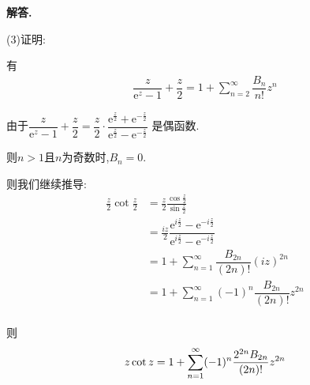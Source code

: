 \documentclass[12pt, a4paper, oneside]{ctexart}
\newenvironment{solution}{\par\noindent\textbf{解答. }}{\par}
\begin{document}
\begin{solution}
\par
(3)证明:
\par
有
$$
\begin{aligned}
\dfrac{z}{\mathrm{e}^z-1}+\dfrac{z}{2}=1+\sum_{n=2}^{\infty}\dfrac{B_n}{n!}z^n
\end{aligned}
$$
\par
由于$\dfrac{z}{\mathrm{e}^z-1}+\dfrac{z}{2}=
\dfrac{z}{2}\cdot\dfrac{\mathrm{e}^{\frac{z}{2}}
+\mathrm{e}^{-\frac{z}{2}}}{\mathrm{e}^{\frac{z}{2}}-\mathrm{e}^{-\frac{z}{2}}}$
是偶函数.
\par
则$n>1$且$n$为奇数时,$B_n=0$.
\par
则我们继续推导:
$$
\begin{aligned}
    \frac{z}{2}\cot \frac{z}{2}&=\frac{z}{2}\frac{\cos \frac{z}{2}}{\sin \frac{z}{2}}\\
           &=\frac{iz}{2}\dfrac{{\mathrm{e}^{i\frac{z}{2}}}-\mathrm{e}^{-i\frac{z}{2}}}{\mathrm{e}^{i\frac{z}{2}}-\mathrm{e}^{-i\frac{z}{2}}}\\
           &=1+\sum_{n=1}^{\infty}\dfrac{B_{2n}}{(2n)!}(iz)^{2n}\\
           &=1+\sum_{n=1}^{\infty}(-1)^n\dfrac{B_{2n}}{(2n)!}z^{2n}\\
\end{aligned}
$$
\par
则
$$
z\cot z=1+\sum_{n=1}^{\infty}(-1)^n\dfrac{2^{2n}B_{2n}}{(2n)!}z^{2n}\\
$$



\end{solution}
\end{document}
